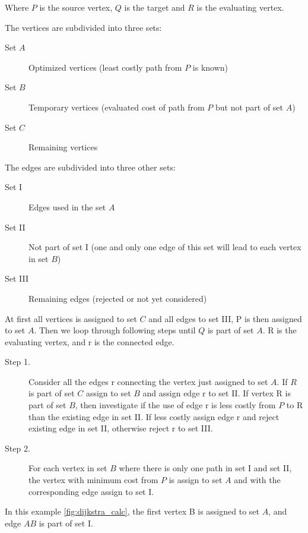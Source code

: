   Where $P$ is the source vertex, $Q$ is the target and $R$ is the evaluating vertex.

  The vertices are subdivided into three sets:

  \begin{description}
    \item[Set $A$]{Optimized vertices (least costly path from $P$ is known)}
    \item[Set $B$]{Temporary vertices (evaluated cost of path from $P$ but not part of set $A$)}
    \item[Set $C$]{Remaining vertices}
  \end{description}

  The edges are subdivided into three other sets:

  \begin{description}
    \item[Set \RN{1}]{Edges used in the set $A$}
    \item[Set \RN{2}]{Not part of set I (one and only one edge of this set will lead to each vertex in set $B$)}
    \item[Set \RN{3}]{Remaining edges (rejected or not yet considered)}
  \end{description}

  At first all vertices is assigned to set $C$ and all edges to set \RN{3}, P is then assigned to set $A$.
  Then we loop through following steps until $Q$ is part of set $A$. R is the evaluating vertex, and r is the connected edge.

  \begin{description}
    \item[Step 1.]{Consider all the edges r connecting the vertex just assigned to set $A$. If $R$ is part of set $C$ assign to set $B$ and assign edge r to set \RN{2}. If vertex R is part of set $B$, then investigate if the use of edge r is less costly from $P$ to R than the existing edge in set \RN{2}. If less costly assign edge r and reject existing edge in set \RN{2}, otherwise reject r to set \RN{3}.}
    \item[Step 2.]{For each vertex in set $B$ where there is only one path in set \RN{1} and set \RN{2}, the vertex with minimum cost from $P$ is assign to set $A$ and with the corresponding edge assign to set \RN{1}.}
  \end{description}



  In this example \cref{fig:dijkstra_calc}, the first vertex B is assigned to set $A$, and edge $AB$ is part of set \RN{1}.

